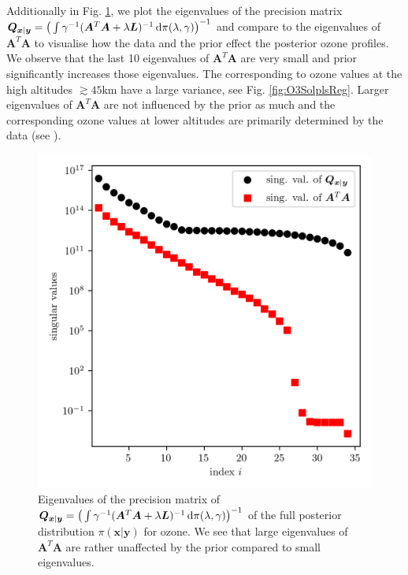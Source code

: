 Additionally in Fig. \ref{fig:PostCov}, we plot the eigenvalues of the precision matrix $\bm{Q}_{ \bm{x}|\bm{y}}= \big(\int \gamma^{-1}(\bm{A}^T \bm{A} + \lambda \bm{L})^{-1}\mathop{}\!\mathrm{d} \pi(\lambda ,\gamma)\big)^{-1} $ and compare to the eigenvalues of $\bm{A}^T \bm{A}$ to visualise how the data and the prior effect the posterior ozone profiles.
We observe that the last 10 eigenvalues of $\bm{A}^T \bm{A}$ are very small and prior significantly increases those eigenvalues.
The corresponding to ozone values at the high altitudes $\gtrsim 45$km have a large variance, see Fig. \ref{fig:O3SolplsReg}.
Larger eigenvalues of $\bm{A}^T \bm{A}$ are not influenced by the prior as much and the corresponding ozone values at lower altitudes are  primarily determined by the data (see \cite{fox2025BlokkLecNot}).
\begin{figure}[ht!]
	\centering
	\includegraphics{CovSing.png}
	\caption[Eigenvalues of the posterior precision matrix]{Eigenvalues of the precision matrix of $\bm{Q}_{ \bm{x}|\bm{y}}= \big(\int \gamma^{-1}(\bm{A}^T \bm{A} + \lambda \bm{L})^{-1}\mathop{}\!\mathrm{d} \pi(\lambda ,\gamma)\big)^{-1}$ of the full posterior distribution $\pi(\bm{x}|\bm{y})$ for ozone. %
	We see that large eigenvalues of $\bm{A}^T \bm{A}$ are rather unaffected by the prior compared to small eigenvalues.}
	\label{fig:PostCov}
\end{figure}
\clearpage


